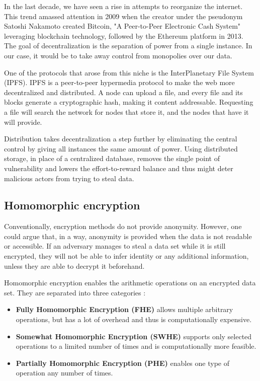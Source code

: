 In the last decade, we have seen a rise in attempts to reorganize the internet. This trend amassed attention in 2009 when the creator under the pseudonym Satoshi Nakamoto  \cite{bitcoin} created Bitcoin, "A Peer-to-Peer Electronic Cash System" leveraging blockchain technology, followed by the Ethereum \cite{ethereum} platform in 2013.
The goal of decentralization is the separation of power from a single instance. In our case, it would be to take away control from monopolies over our data. 

One of the protocols that arose from this niche is the InterPlanetary File System (IPFS)\cite{DBLP:journals/corr/Benet14}. IPFS is a peer-to-peer hypermedia protocol to make the web more decentralized and distributed. A node can upload a file, and every file and its blocks generate a cryptographic hash, making it content addressable. Requesting a file will search the network for nodes that store it, and the nodes that have it will provide.

Distribution takes decentralization a step further by eliminating the central control by giving all instances the same amount of power. Using distributed storage, in place of a centralized database, removes the single point of vulnerability and lowers the effort-to-reward balance and thus might deter malicious actors from trying to steal data.

\subsection{Homomorphic encryption}
Conventionally, encryption methods do not provide anonymity. However, one could argue that, in a way, anonymity is provided when the data is not readable or accessible. If an adversary manages to steal a data set while it is still encrypted, they will not be able to infer identity or any additional information, unless they are able to decrypt it beforehand. 

Homomorphic encryption enables the arithmetic operations on an encrypted data set. They are separated into three categories \cite{DBLP:journals/corr/abs-1812-02428}:
\begin{itemize}
    \item \textbf{Fully Homomorphic Encryption (FHE)} allows multiple arbitrary operations, but has a lot of overhead and thus is computationally expensive.
    \item \textbf{Somewhat Homomorphic Encryption (SWHE)} supports only selected operations to a limited number of times and is computationally more feasible.
    \item \textbf{Partially Homomorphic Encryption (PHE)} enables one type of operation any number of times.
\end{itemize}

